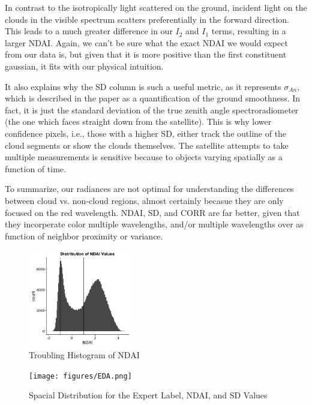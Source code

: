 \documentclass{article}\usepackage[]{graphicx}\usepackage[]{color}
\begin{document}
In contrast to the isotropically light scattered on the ground, incident light on the clouds in the visible spectrum scatters preferentially in the forward direction.  This leads to a much greater difference in our \(I_2\) and \(I_1\) terms, resulting in a larger NDAI.  Again, we can’t be sure what the exact NDAI we would expect from our data is, but given that it is more positive than the first constituent gaussian, it fits with our physical intuition.

It also explains why the SD column is such a useful metric, as it represents \(\sigma_{An}\), which is described in the paper as a quantification of the ground smoothness.  In fact, it is just the standard deviation of the true zenith angle spectroradiometer (the one which faces straight down from the satellite).  This is why lower confidence pixels, i.e., those with a higher SD, either track the outline of the cloud segments or show the clouds themselves.  The satellite attempts to take multiple measurements is sensitive because to objects varying spatially as a function of time.

To summarize, our radiances are not optimal for understanding the differences between cloud vs. non-cloud regions, almost certainly becasue they are only focused on the red wavelength.  NDAI, SD, and CORR are far better, given that they incorperate color multiple wavelengths, and/or multiple wavelengths over as function of neighbor proximity or variance.

\begin{figure}[h!]
\begin{center}
\caption{Troubling Histogram of NDAI}
\includegraphics[width = 0.4\textwidth]{figures/NDAI_Histogram.jpeg}
\end{center}
\end{figure}

\begin{figure}[h!]
\begin{center}
\caption{Spacial Distribution for the Expert Label, NDAI, and SD Values}
\texttt{[image: figures/EDA.png]}
\end{center}
\end{figure}
\end{document}
